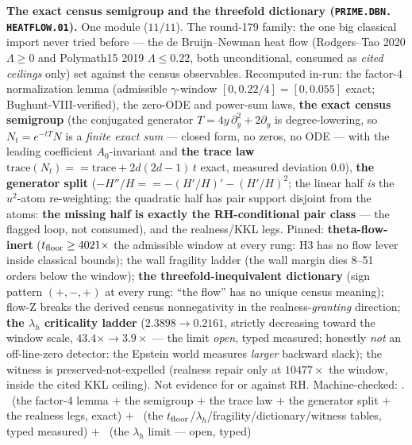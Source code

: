 \par\smallskip\noindent\textbf{The exact census semigroup and the
threefold dictionary (\texttt{PRIME.\allowbreak DBN.\allowbreak
HEATFLOW.01}).}
One module ($11/11$).  The round-179 family: the one big classical
import never tried before --- the de Bruijn--Newman heat flow
(Rodgers--Tao 2020 $\Lambda \ge 0$ and Polymath15 2019 $\Lambda
\le 0.22$, both unconditional, consumed as \emph{cited ceilings}
only) set against the census observables.  Recomputed in-run: the
factor-4 normalization lemma (admissible $\gamma$-window
$[0, 0.22/4] = [0, 0.055]$ exact; Bughunt-VIII-verified), the
zero-ODE and power-sum laws, \textbf{the exact census semigroup}
(the conjugated generator $T = 4y\,\partial_y^2 + 2\partial_y$ is
degree-lowering, so $N_t = e^{-tT}N$ is a \emph{finite exact sum}
--- closed form, no zeros, no ODE --- with the leading coefficient
$A_0$-invariant and \textbf{the trace law} $\mathrm{trace}(N_t) ==
\mathrm{trace} + 2d(2d-1)\,t$ exact, measured deviation $0.0$),
\textbf{the generator split} ($-H''/H == -(H'/H)' - (H'/H)^2$; the
linear half \emph{is} the $u^2$-atom re-weighting; the quadratic
half has pair support disjoint from the atoms: \textbf{the missing
half is exactly the RH-conditional pair class} --- the flagged
loop, not consumed), and the realness/KKL legs.  Pinned:
\textbf{theta-flow-inert} ($t_{\rm floor} \ge 4021\times$ the
admissible window at every rung: H3 has no flow lever inside
classical bounds); the wall fragility ladder (the wall margin dies
8--51 orders below the window); \textbf{the threefold-inequivalent
dictionary} (sign pattern $(+,-,+)$ at every rung: ``the flow''
has no unique census meaning); flow-Z breaks the derived census
nonnegativity in the realness-\emph{granting} direction;
\textbf{the $\lambda_h$ criticality ladder} ($2.3898 \to 0.2161$,
strictly decreasing toward the window scale, $43.4\times \to
3.9\times$ --- the limit \emph{open}, typed measured; honestly
\emph{not} an off-line-zero detector: the Epstein world measures
\emph{larger} backward slack); the witness is
preserved-not-expelled (realness repair only at $10477\times$ the
window, inside the cited KKL ceiling).  Not evidence for or
against RH.
Machine-checked: .
\mE\ (the factor-4 lemma $+$ the semigroup $+$ the trace law $+$
the generator split $+$ the realness legs, exact) $+$ \mC\ (the
$t_{\rm floor}$/$\lambda_h$/fragility/dictionary/witness tables,
typed measured) $+$ \mO\ (the $\lambda_h$ limit --- open, typed)
\par\smallskip


